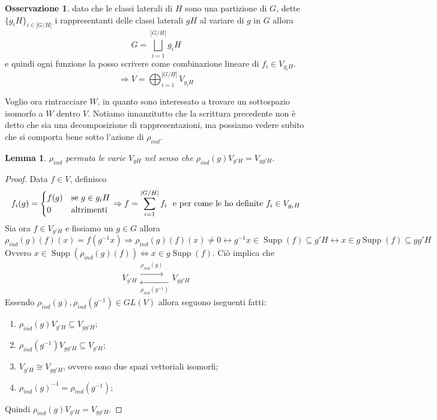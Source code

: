 \documentclass[11pt]{article}
\theoremstyle{plain}
\newtheorem{lemma}[thm]{Lemma}
\theoremstyle{definition}
\newtheorem*{rem}{Osservazione}
\theoremstyle{remark}
\DeclareMathOperator{\Supp}{Supp}
\begin{document}
\begin{rem} dato che le classi laterali di $H$ sono una partizione di $G$, dette $\{g_iH\}_{i\in |G/H|}$ i rappresentanti delle classi laterali $gH$ al variare di $g$ in $G$ allora 
\[G=\bigsqcup_{i=1}^{|G/H|} g_iH\] 
e quindi ogni funzione la posso scrivere come combinazione lineare di $f_i\in V_{g_iH}$.
\[\Rightarrow V=\bigoplus_{i=1}^{|G/H|} V_{g_iH}\]
\end{rem}
Voglio ora rintracciare $W$, in quanto sono interessato a trovare un sottospazio isomorfo a $W$ dentro $V$. Notiamo innanzitutto che la scrittura precedente non è detto che sia una decomposizione di rappresentazioni, ma possiamo vedere subito che si comporta bene sotto l'azione di $\rho_{ind}$. 

\begin{lemma}
$\rho_{ind}$ permuta le varie $V_{gH}$ nel senso che $\rho_{ind}(g)V_{g'H}=V_{gg'H}$. 
\end{lemma}

\begin{proof} Data $f\in V$, definisco
  \[f_i(g)=\begin{cases}
    f(g)& \textup{se } g\in g_iH\\
    0& \textup{altrimenti}
  \end{cases}\Rightarrow f=\sum_{i=1}^{|G/H|} f_i\ \textup{ e per come le ho definite } f_i\in V_{g_iH}\]
  Sia ora $f\in V_{g'H}$ e fissiamo un $g\in G$ allora
  \[\rho_{ind}(g)(f)(x)=f(g^{-1}x)\Rightarrow \rho_{ind}(g)(f)(x)\neq 0\leftrightarrow g^{-1}x\in \Supp(f)\subseteq g'H\leftrightarrow x\in g\Supp(f)\subseteq gg'H\]
  Ovvero $x\in \Supp(\rho_{ind}(g)(f))\Leftrightarrow x\in g\Supp(f)$. Ciò implica che
  \[ V_{g'H} \begin{matrix}
    \overset{\rho_{ind}(g)}{\longrightarrow}\\ 
    \underset{\rho_{ind}(g^{-1})}{\longleftarrow}
  \end{matrix} V_{gg'H} \]
  Essendo $\rho_{ind}(g),\rho_{ind}(g^{-1})\in GL(V)$ allora seguono iseguenti fatti:
  \begin{enumerate}
  \item $\rho_{ind}(g)V_{g'H}\subseteq V_{gg'H}$;
  \item $\rho_{ind}(g^{-1})V_{gg'H}\subseteq V_{g'H}$;
  \item $V_{g'H}\cong V_{gg'H}$, ovvero sono due spazi vettoriali isomorfi;
  \item $\rho_{ind}(g)^{-1}=\rho_{ind}(g^{-1})$;
  \end{enumerate}
  Quindi $\rho_{ind}(g)V_{g'H}=V_{gg'H}$. 
\end{proof}
\end{document}
